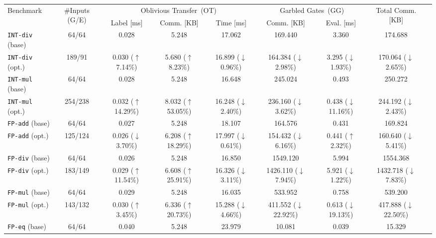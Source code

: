 \begin{tabular}{lcccccccc}
    \toprule[1.2pt]
    \multirow{2}{*}{Benchmark} & \multirow{2}{*}{\#Inputs (G/E)} & \multicolumn{3}{c}{Oblivious Transfer~(OT)} & \multicolumn{2}{c}{Garbled Gates~(GG)} & \multirow{2}{*}{Total Comm. [KB]} \\
    \cmidrule(lr){3-5} \cmidrule(lr){6-7}
     & & Label [ms] & Comm. [KB] & Time [ms] & Comm. [KB] & Eval. [ms] & \\
    \midrule
    \texttt{INT-div} (base) & 64/64 & 0.028 & 5.248 & 17.062 & 169.440 & 3.360 & 174.688 \\
    \texttt{INT-div} (opt.) & 189/91 & 0.030 ($\uparrow$ 7.14\%) & 5.680 ($\uparrow$ 8.23\%) & 16.899 ($\downarrow$ 0.96\%) & 164.384 ($\downarrow$ 2.98\%) & 3.295 ($\downarrow$ 1.93\%) & 170.064 ($\downarrow$ 2.65\%) \\
    \midrule
    \texttt{INT-mul} (base) & 64/64 & 0.028 & 5.248 & 16.648 & 245.024 & 0.493 & 250.272 \\
    \texttt{INT-mul} (opt.) & 254/238 & 0.032 ($\uparrow$ 14.29\%) & 8.032 ($\uparrow$ 53.05\%) & 16.248 ($\downarrow$ 2.40\%) & 236.160 ($\downarrow$ 3.62\%) & 0.438 ($\downarrow$ 11.16\%) & 244.192 ($\downarrow$ 2.43\%) \\
    \midrule
    \texttt{FP-add} (base) & 64/64 & 0.027 & 5.248 & 18.107 & 164.576 & 0.431 & 169.824 \\
    \texttt{FP-add} (opt.) & 125/124 & 0.026 ($\downarrow$ 3.70\%) & 6.208 ($\uparrow$ 18.29\%) & 17.997 ($\downarrow$ 0.61\%) & 154.432 ($\downarrow$ 6.16\%) & 0.441 ($\uparrow$ 2.32\%) & 160.640 ($\downarrow$ 5.41\%) \\
    \midrule
    \texttt{FP-div} (base) & 64/64 & 0.026 & 5.248 & 16.850 & 1549.120 & 5.994 & 1554.368 \\
    \texttt{FP-div} (opt.) & 183/149 & 0.029 ($\uparrow$ 11.54\%) & 6.608 ($\uparrow$ 25.91\%) & 16.326 ($\downarrow$ 3.11\%) & 1426.110 ($\downarrow$ 7.94\%) & 5.921 ($\downarrow$ 1.22\%) & 1432.718 ($\downarrow$ 7.83\%) \\
    \midrule
    \texttt{FP-mul} (base) & 64/64 & 0.029 & 5.248 & 16.035 & 533.952 & 0.758 & 539.200 \\
    \texttt{FP-mul} (opt.) & 143/132 & 0.030 ($\uparrow$ 3.45\%) & 6.336 ($\uparrow$ 20.73\%) & 15.288 ($\downarrow$ 4.66\%) & 411.552 ($\downarrow$ 22.92\%) & 0.613 ($\downarrow$ 19.13\%) & 417.888 ($\downarrow$ 22.50\%) \\
    \midrule
    \texttt{FP-eq} (base) & 64/64 & 0.040 & 5.248 & 23.979 & 10.081 & 0.039 & 15.329 \\

\end{tabular}
